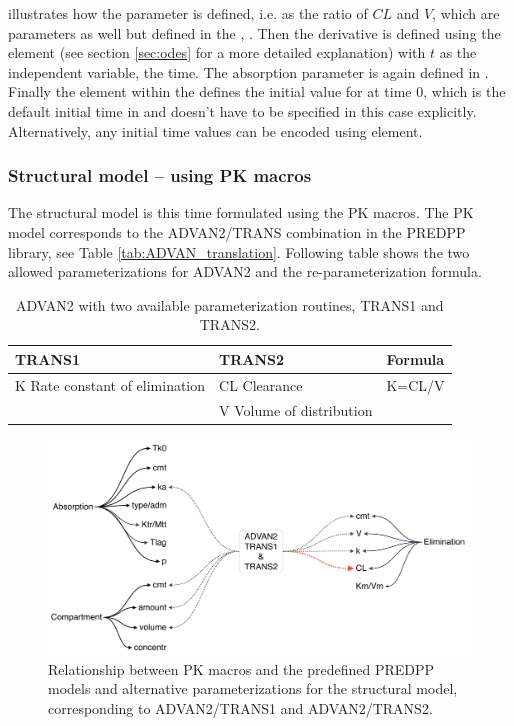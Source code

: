 illustrates how the parameter  is defined, i.e. as the ratio of $CL$ and $V$, 
which are parameters as well but defined in the , . 
Then the derivative  is defined using the element 
(see section \ref{sec:odes} for a more detailed explanation)
with $t$ as the independent variable, the time. The absorption parameter  
is again defined in .
Finally the  element within the  defines
the initial value for  at time 0, which is the default 
initial time in \pharmml and doesn't have to be specified in this case explicitly. 
Alternatively, any initial time values can be encoded using  element.


\subsubsection{Structural model -- using PK macros}
The structural model is this time formulated using the PK macros. 
The PK model corresponds to the ADVAN2/TRANS combination 
in the PREDPP library, see Table \ref{tab:ADVAN_translation}.
Following table shows the two allowed parameterizations for ADVAN2 
and the re-parameterization formula. 
\begin{table}[ht]
\begin{center}
\begin{tabular*}{.8\textwidth}{@{\extracolsep{\fill} } lll}
  \hline
  \hline
  TRANS1								& TRANS2						& Formula \\
  \hline
K Rate constant of elimination				& CL Clearance 					& K=CL/V \\
									& V Volume of distribution				& \\
\end{tabular*}
\caption{ADVAN2 with two available parameterization routines, TRANS1 and TRANS2.}
\end{center}
\end{table}
\begin{figure}[htbp]
\centering
\includegraphics[width=.8\textwidth]{pics/Advan2_Parameterizations}
\caption{Relationship between PK macros and the predefined PREDPP models and 
alternative parameterizations for the structural model, corresponding 
to ADVAN2/TRANS1 and ADVAN2/TRANS2.}
\label{fig:lambdasurface}
\end{figure}

